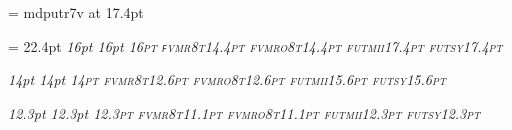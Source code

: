 \def\ttfontprefix{fvm}

\def\ttshape{r8t}
\def\ttbshape{b8t}
\def\ttslshape{ro8t}
\def\ttbslshape{bo8t}

\def\mtfontprefix{fut}

\def\mtitshape{mii}			%
\def\mtsyshape{sy}			%
\font\elevenex=  mdputr7v at 17.4pt 	%

\ifx\bigger\relax
  \def\textfontsize{17.4pt}
  \setfont\textrm\rmfontprefix\rmshape{\textfontsize}
\else
  \def\textfontsize{16pt}
  \textleading = 22.4pt %
  \setfont\textrm\rmfontprefix\rmshape{\textfontsize}
\fi
\setfont\textbf\rmfontprefix\bfshape{\textfontsize}
\setfont\textit\rmfontprefix\itshape{\textfontsize}
\setfont\textsl\rmfontprefix\slshape{\textfontsize}
\setfont\textsc\rmfontprefix\scshape{\textfontsize}
\setfont\texttt\ttfontprefix\ttshape{14.4pt}		%
\setfont\textttsl\ttfontprefix\ttslshape{14.4pt}	%
\setfont\texti\mtfontprefix\mtitshape{17.4pt}	%
\setfont\textsy\mtfontprefix\mtsyshape{17.4pt}	%

\setfont{}\rmfontprefix\bxshape{14.5pt} %
\def\df{\let\tentt=\deftt \let\tenbf = \defbf \bf}

\def\smallfontsize{14pt}		%
\setfont\smallrm\rmfontprefix\rmshape{\smallfontsize}
\setfont\smallbf\rmfontprefix\bfshape{\smallfontsize}
\setfont\smallit\rmfontprefix\itshape{\smallfontsize}
\setfont\smallsl\rmfontprefix\slshape{\smallfontsize}
\setfont\smallsc\rmfontprefix\scshape{\smallfontsize}
\setfont\smalltt\ttfontprefix\ttshape{12.6pt}
\setfont\smallttsl\ttfontprefix\ttslshape{12.6pt}
\setfont\smalli\mtfontprefix\mtitshape{15.6pt}
\setfont\smallsy\mtfontprefix\mtsyshape{15.6pt}

\def\smallerfontsize{12.3pt}		%
\setfont\smallerrm\rmfontprefix\rmshape{\smallerfontsize}
\setfont\smallerbf\rmfontprefix\bfshape{\smallerfontsize}
\setfont\smallerit\rmfontprefix\itshape{\smallerfontsize}
\setfont\smallersl\rmfontprefix\slshape{\smallerfontsize}
\setfont\smallersc\rmfontprefix\scshape{\smallerfontsize}
\setfont\smallertt\ttfontprefix\ttshape{11.1pt}
\setfont\smallerttsl\ttfontprefix\ttslshape{11.1pt}
\setfont\smalleri\mtfontprefix\mtitshape{\smallerfontsize}
\setfont\smallersy\mtfontprefix\mtsyshape{\smallerfontsize}

